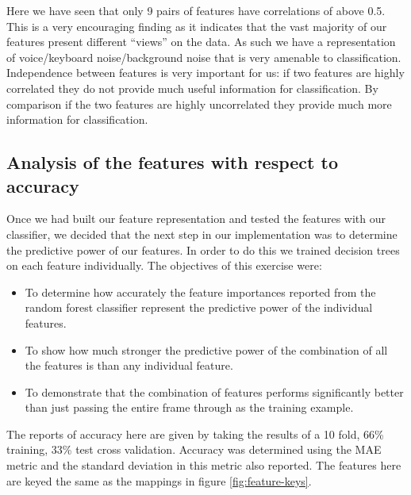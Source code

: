 \documentclass[ %
                    author={Sam Phippen},
                supervisor={Dr. Rafal Bogacz},
                     title={Real time voice activity detectors in noisy personal computing environments},
                  subtitle={},
                    degree={MEng},
                      year={2012} ]{thesis}
\begin{document}
Here we have seen that only 9 pairs of features have correlations of above 0.5.
This is a very encouraging finding as it indicates that the vast majority of
our features present different ``views'' on the data. As such we have a
representation of voice/keyboard noise/background noise that is very amenable
to classification. Independence between features is very important for us: if
two features are highly correlated they do not provide much useful information
for classification. By comparison if the two features are highly uncorrelated
they provide much more information for classification.

\subsection{Analysis of the features with respect to accuracy}

Once we had built our feature representation and tested the features with our
classifier, we decided that the next step in our implementation was to
determine the predictive power of our features. In order to do this we trained
decision trees on each feature individually. The objectives of this exercise were:

\begin{itemize}

    \item To determine how accurately the feature importances reported from the random
        forest classifier represent the predictive power of the individual features.

    \item To show how much stronger the predictive power of the
        combination of all the features is than any individual feature.


    \item To demonstrate that the combination of features performs
        significantly better than just passing the entire frame through as the training
        example.

\end{itemize}

The reports of accuracy here are given by taking the results of a 10 fold, 66\%
training, 33\% test cross validation. Accuracy was determined using the MAE
metric and the standard deviation in this metric also reported. The features
here are keyed the same as the mappings in figure \ref{fig:feature-keys}.
\end{document}
